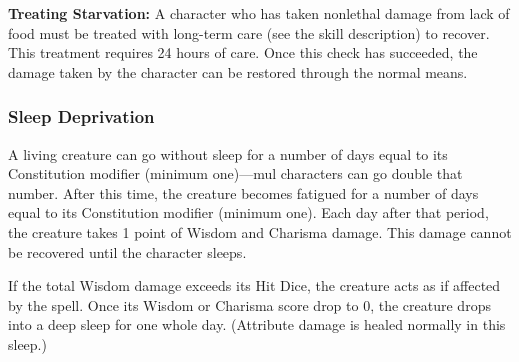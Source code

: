 \textbf{Treating Starvation:} A character who has taken nonlethal damage from lack of food must be treated with long-term care (see the  skill description) to recover. This treatment requires 24 hours of care. Once this  check has succeeded, the damage taken by the character can be restored through the normal means.

\subsubsection{Sleep Deprivation}
A living creature can go without sleep for a number of days equal to its Constitution modifier (minimum one)---mul characters can go double that number. After this time, the creature becomes fatigued for a number of days equal to its Constitution modifier (minimum one). Each day after that period, the creature takes 1 point of Wisdom and Charisma damage. This damage cannot be recovered until the character sleeps.

If the total Wisdom damage exceeds its Hit Dice, the creature acts as if affected by the  spell. Once its Wisdom or Charisma score drop to 0, the creature drops into a deep sleep for one whole day. (Attribute damage is healed normally in this sleep.)